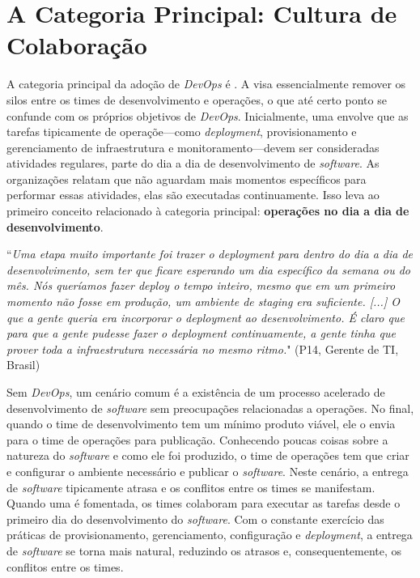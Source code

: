 \section{A Categoria Principal: Cultura de Colaboração}\label{secao_core_category}

A categoria principal da adoção de {\it DevOps} é \cc. A \cc visa essencialmente
remover os silos entre os times de desenvolvimento e operações, o que até certo
ponto se confunde com os próprios objetivos de {\it DevOps}. Inicialmente, uma
\cc envolve que as tarefas tipicamente de operaçõe---como {\it deployment},
provisionamento e gerenciamento de infraestrutura e monitoramento---devem ser
consideradas atividades regulares, parte do dia a dia de desenvolvimento de
{\it software}. As organizações relatam que não aguardam mais momentos específicos
para performar essas atividades, elas são executadas continuamente. Isso leva
ao primeiro conceito relacionado à categoria principal: {\bf operações no dia
a dia de desenvolvimento}.

\begin{mq}
``\emph{Uma etapa muito importante foi trazer o {\it deployment} para dentro do
dia a dia de desenvolvimento, sem ter que ficare esperando um dia específico
da semana ou do mês. Nós queríamos fazer {\it deploy} o tempo inteiro, mesmo
que em um primeiro momento não fosse em produção, um ambiente de {\it staging}
era suficiente. [...] O que a gente queria era incorporar o {\it deployment} ao
desenvolvimento. É claro que para que a gente pudesse fazer o {\it deployment}
continuamente, a gente tinha que prover toda a infraestrutura necessária no
mesmo ritmo.}" (P14, Gerente de \acrshort{TI}, Brasil)
\end{mq}

Sem {\it DevOps}, um cenário comum é a existência de um processo acelerado de
desenvolvimento de {\it software} sem preocupações relacionadas a operações.
No final, quando o time de desenvolvimento tem um mínimo produto viável, ele
o envia para o time de operações para publicação. Conhecendo poucas coisas sobre
a natureza do {\it software} e como ele foi produzido, o time de operações tem
que criar e configurar o ambiente necessário e publicar o {\it software}. Neste
cenário, a entrega de {\it software} tipicamente atrasa e os conflitos entre
os times se manifestam. Quando uma \cc é fomentada, os times colaboram para
executar as tarefas desde o primeiro dia do desenvolvimento do {\it software}.
Com o constante exercício das práticas de provisionamento, gerenciamento,
configuração e {\it deployment}, a entrega de {\it software} se torna mais
natural, reduzindo os atrasos e, consequentemente, os conflitos entre os times.

